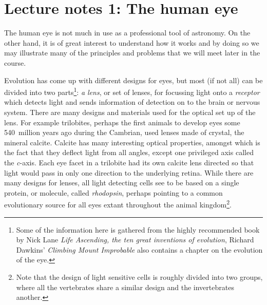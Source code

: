 
\section*{Lecture notes 1: The human eye}

The human eye is not much in use as a professional tool of
astronomy. On the other hand, it is of great interest to understand how it
works and by doing so we may illustrate many of the principles and
problems that we will meet later in the course.

Evolution has come up with different designs for eyes, but most (if
not all) can be divided into two parts\footnote{Some of the
  information here is gathered from the highly recommended book by
  Nick Lane {\it Life Ascending, the ten great inventions of
    evolution}, Richard Dawkins' {\it Climbing Mount
    Improbable} also contains a chapter on the evolution of the eye.}:
{\it a lens}, or set of lenses, for
focussing light onto a {\it receptor} which detects light and sends
information of detection on to the brain or nervous system. There are
many designs and materials used for the optical set up of the
lens. For example trilobites, perhaps the first animals to develop
eyes some 540~million years ago during the Cambrian, used lenses made
of crystal, the mineral calcite. Calcite has many interesting optical
properties, amongst which is the fact that they deflect light from all
angles, except one privileged axis called the {\it c}-axis. Each eye
facet in a trilobite had its own calcite lens directed so that light
would pass in only one direction to the underlying retina. While there
are many designs for lenses, all light detecting cells see to be based
on a single protein, or molecule, called {\it rhodopsin}, perhaps
pointing to a common evolutionary source for all eyes extant
throughout the animal kingdom\footnote{Note that the design
  of light sensitive cells is roughly divided into two groups, where
  all the vertebrates share a similar design and the invertebrates another.}.

